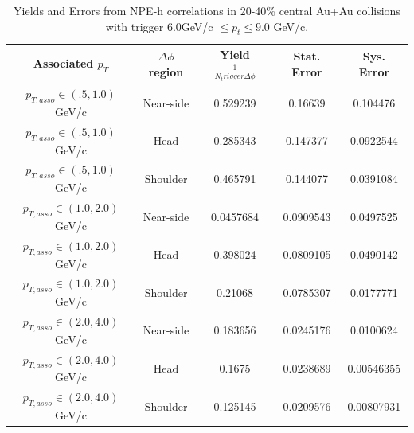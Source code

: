 \begin{table}
\centering
\begin{tabular}{|c|c|c|c|c|}
\hline
Associated $p_T$	& $\Delta\phi$ region & Yield $\frac{1}{N_trigger \Delta\phi}$ & Stat. Error & Sys. Error\\
\hline
$p_{T,asso} \in(.5, 1.0)$ GeV/c  & Near-side & 0.529239 & 0.16639 & 0.104476 \\
\hline
$p_{T,asso} \in(.5, 1.0)$ GeV/c  & Head & 0.285343 & 0.147377 & 0.0922544 \\
\hline
$p_{T,asso} \in(.5, 1.0)$ GeV/c  & Shoulder & 0.465791 & 0.144077 & 0.0391084 \\
\hline
$p_{T,asso} \in(1.0, 2.0)$ GeV/c  & Near-side & 0.0457684 & 0.0909543 & 0.0497525 \\
\hline
$p_{T,asso} \in(1.0, 2.0)$ GeV/c  & Head & 0.398024 & 0.0809105 & 0.0490142 \\
\hline
$p_{T,asso} \in(1.0, 2.0)$ GeV/c  & Shoulder & 0.21068 & 0.0785307 & 0.0177771 \\
\hline
$p_{T,asso} \in(2.0, 4.0)$ GeV/c  & Near-side & 0.183656 & 0.0245176 & 0.0100624 \\
\hline
$p_{T,asso} \in(2.0, 4.0)$ GeV/c  & Head & 0.1675 & 0.0238689 & 0.00546355 \\
\hline
$p_{T,asso} \in(2.0, 4.0)$ GeV/c  & Shoulder & 0.125145 & 0.0209576 & 0.00807931 \\
\hline
\end{tabular}
\caption[Yields and Errors in Au+Au Correlations, 20-40\%, High Trigger]{Yields and Errors from NPE-h correlations in 20-40\% central Au+Au collisions with trigger $6.0 $GeV/c $\leq p_t \leq 9.0$ GeV/c.}
\label{tab:AuAuYieldMidHigh}
\end{table} 

